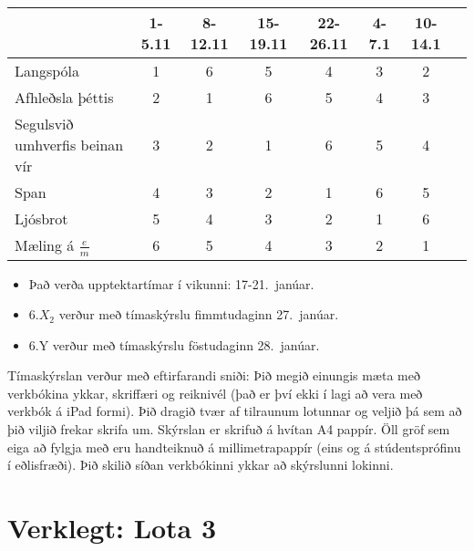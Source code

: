 \hspace{0.5cm}

\begin{table}[H]
    \centering
    \begin{tabular}{|l||c|c|c|c|c|c|c|}
    \hline 
         & 1-5.11 & 8-12.11 & 15-19.11 & 22-26.11 & 4-7.1 & 10-14.1   \\ \hline \hline
        Langspóla & 1 & 6  & 5 & 4 & 3 & 2   \\ \hline
        Afhleðsla þéttis & 2 & 1 & 6 & 5 & 4 & 3 \\ \hline
        Segulsvið umhverfis beinan vír & 3 & 2 & 1 & 6 & 5 & 4 \\ \hline
        Span & 4 & 3 & 2 & 1 & 6  & 5  \\ \hline
        Ljósbrot & 5 & 4 & 3 & 2 & 1 & 6   \\ \hline
        Mæling á $\frac{e}{m}$ & 6 & 5 & 4 & 3 & 2 & 1  \\ \hline
    \end{tabular}
\end{table}


\begin{itemize}
    \item Það verða upptektartímar í vikunni: 17-21.~janúar.
    \item 6.$X_2$ verður með tímaskýrslu fimmtudaginn 27.~janúar.
    \item 6.Y verður með tímaskýrslu föstudaginn 28.~janúar.
\end{itemize}

Tímaskýrslan verður með eftirfarandi sniði: Þið megið einungis mæta með verkbókina ykkar, skriffæri og reiknivél (það er því ekki í lagi að vera með verkbók á iPad formi). Þið dragið tvær af tilraunum lotunnar og veljið þá sem að þið viljið frekar skrifa um. Skýrslan er skrifuð á hvítan A4 pappír. Öll gröf sem eiga að fylgja með eru handteiknuð á millimetrapappír (eins og á stúdentsprófinu í eðlisfræði). Þið skilið síðan verkbókinni ykkar að skýrslunni lokinni.

\newpage

\section*{Verklegt: Lota 3}

